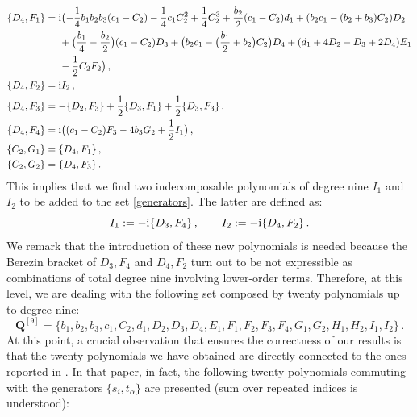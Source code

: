\documentclass[10pt]{amsart}
\theoremstyle{definition}
\theoremstyle{corollary}
\theoremstyle{remark}
\theoremstyle{conclusion}
\begin{document}
\begin{align}
\{D_4, F_1\}&={\rm i}\bigl(-\frac{1}{4}b_1 b_2 b_3 (c_1-C_2)-\frac{1}{4}c_1 C_2^2+\frac{1}{4}C_2^3+\frac{b_2}{2}(c_1 -C_2)d_1+(b_2c_1-(b_2+b_3)C_2)D_2\nonumber \\
&\hskip 0.5cm+\bigl(\frac{b_1}{4}-\frac{b_2}{2}\bigl)(c_1-C_2)D_3+\bigl(b_2 c_1-\bigl(\frac{b_1}{2}+b_2\bigl)C_2\bigl)D_4+(d_1+4D_2-D_3+2D_4)E_1\nonumber \\
&\hskip 0.5 cm-\frac{1}{2}C_2 F_2\bigl) \, ,\nonumber \\
\{D_4, F_2\}&={\rm i}I_2 \, ,\nonumber \\
\{D_4, F_3\}&=-\{D_2,F_3\}+\frac{1}{2}\{D_3,F_1\}+\frac{1}{2}\{D_3, F_3\} \, ,\nonumber \\
\{D_4, F_4\}&={\rm i}\bigl((c_1-C_2)F_3-4 b_3 G_2+\frac{1}{2}I_1\bigl) \, ,\nonumber \\
\{C_2, G_1\}&=\{D_4,F_1\} \, ,\nonumber \\
\{C_2,G_2\}&=\{D_4, F_3\} \, .
\end{align}
This implies that we find two indecomposable polynomials of degree nine $I_{1}$ and $I_2$ to be added to the set \eqref{generators}. The latter are defined as:
\begin{equation}
I_1:=-{\rm i}\{D_3, F_4\} \, ,\qquad I_2:=-{\rm i}\{D_4, F_2\} \, .
\end{equation}
We remark that the introduction of these new polynomials is needed because the Berezin bracket of $D_3, F_4$ and $D_4, F_2$ turn out to be not expressible as combinations of total degree nine  involving lower-order terms. Therefore, at this level, we are dealing with the following set composed by twenty polynomials up to degree nine:
\begin{equation}
\boldsymbol{Q}^{[9]} =  \{b_1, b_2, b_3, c_1, C_2, d_1, D_2, D_3, D_4, E_1, F_1, F_2, F_3, F_4, G_1, G_2, H_1, H_2, I_1, I_2\} \, . 
\label{generators2}
\end{equation}
At this point, a crucial observation that ensures the correctness of our results is that the twenty polynomials we have obtained are directly connected to the ones reported in \cite{nuclear}. In that paper, in fact, the following twenty polynomials commuting with the generators $\{s_i,t_\alpha\}$ are presented (sum over repeated indices is understood):
\end{document}
